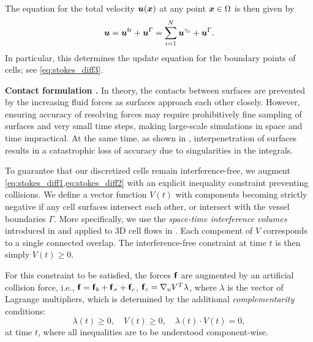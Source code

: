 
The  equation for the total velocity ${\bm{u}}({\bm{x}})$ at any point ${\bm{x}} \in \Omega$ is then given by
\begin{equation}
  {\bm{u}} = {\bm{u}}^{\text{fr}} +{\bm{u}}^\Gamma =  \sum_{i=1}^N {\bm{u}}^{\gamma_i} + {\bm{u}}^\Gamma.
  \label{eq:velocity_combined}
\end{equation}
In particular, this determines the update equation for the boundary
points of cells; see \cref{eq:stokes_diff3}.



\textbf{Contact formulation \label{sec:contact-vol}. }
In theory, the contacts between surfaces are prevented by the increasing fluid forces as surfaces approach each other closely. However, ensuring accuracy of resolving forces may require prohibitively fine sampling of surfaces and very small time steps, making large-scale simulations in space and time impractical. At the same time, as shown in \cite{lu2017}, interpenetration of surfaces results in a catastrophic loss of accuracy due to singularities in the integrals. 

To guarantee that our discretized cells remain interference-free,
we augment \cref{eq:stokes_diff1,eq:stokes_diff2} with an explicit
inequality constraint preventing collisions.  We define a vector
function $V(t)$ with components becoming strictly negative if any cell
surfaces intersect each other, or intersect with the vessel boundaries
$\Gamma$.  More specifically, we use the \emph{space-time interference volumes} introduced in \cite{Harmon2011} and applied to 3D cell flows in \cite{lu2018parallel}.
Each component of $V$ corresponds to a single connected overlap.
The interference-free constraint at time $t$ is then simply $V(t) \geq 0$. 

For this constraint to be satisfied, the forces $\bm{\mathsf{f}}$ are augmented by an artificial collision
force, i.e.,  $\bm{\mathsf{f}} = \bm{\mathsf{f}}_b + \bm{\mathsf{f}}_\sigma + \bm{\mathsf{f}}_c$, $\bm{\mathsf{f}}_c =
\nabla_u V^T \lambda$, where $\lambda$ is the vector of Lagrange
multipliers, which is determined by the additional
\emph{complementarity} conditions:
\begin{equation}
  \lambda(t) \geq 0, \quad V(t) \geq 0, \quad \lambda(t) \cdot V(t) = 0,
  \label{eq:complementarity_prob}
\end{equation}
 at time $t$, where all inequalities are to be understood component-wise.

